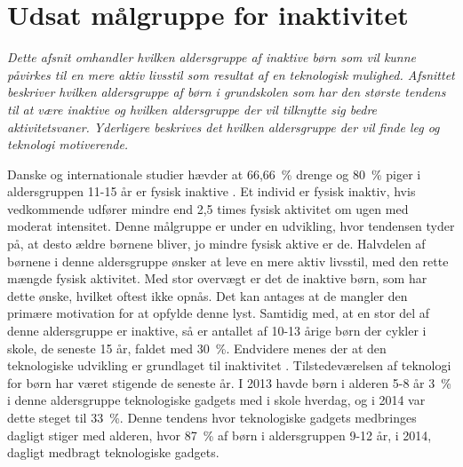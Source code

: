 \section {Udsat målgruppe for inaktivitet}
\textit{Dette afsnit omhandler hvilken aldersgruppe af inaktive børn som vil kunne påvirkes til en mere aktiv livsstil som resultat af en teknologisk mulighed. Afsnittet beskriver hvilken aldersgruppe af børn i grundskolen som har den største tendens til at være inaktive og hvilken aldersgruppe der vil tilknytte sig bedre aktivitetsvaner. Yderligere beskrives det hvilken aldersgruppe der vil finde leg og teknologi motiverende.}
				
Danske og internationale studier hævder at 66,66~\% drenge og 80~\% piger i aldersgruppen 11-15 år er fysisk inaktive \citep{SundhedsstyrrelsenFaktaark}. Et individ er fysisk inaktiv, hvis vedkommende udfører mindre end 2,5 times fysisk aktivitet om ugen med moderat intensitet. \citep{Kiens2007}
Denne målgruppe er under en udvikling, hvor tendensen tyder på, at desto ældre børnene bliver, jo mindre fysisk aktive er de. Halvdelen af børnene i denne aldersgruppe ønsker at leve en mere aktiv livsstil, med den rette mængde fysisk aktivitet. Med stor overvægt er det de inaktive børn, som har dette ønske, hvilket oftest ikke opnås. Det kan antages at de mangler den primære motivation for at opfylde denne lyst. Samtidig med, at en stor del af denne aldersgruppe er inaktive, så er antallet af 10-13 årige børn der cykler i skole, de seneste 15 år, faldet med 30~\%. \citep{Sundhedsstyrelsen2006} Endvidere menes der at den teknologiske udvikling er grundlaget til inaktivitet \citep{Kiens2007}. Tilstedeværelsen af teknologi for børn har været stigende de seneste år. I 2013 havde børn i alderen 5-8 år 3~\% i denne aldersgruppe teknologiske gadgets med i skole hverdag, og i 2014 var dette steget til 33~\%. Denne tendens hvor teknologiske gadgets medbringes dagligt stiger med alderen, hvor 87~\% af børn i aldersgruppen 9-12 år, i 2014, dagligt medbragt teknologiske gadgets. \citep{GjensidigeForsikring2014}   


